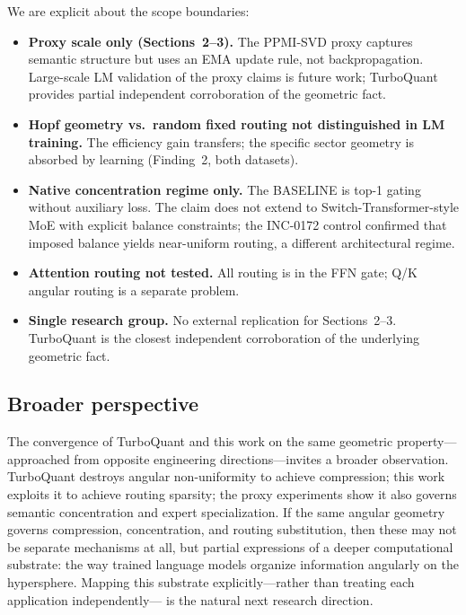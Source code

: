 \documentclass[11pt]{article}
\begin{document}
We are explicit about the scope boundaries:

\begin{itemize}[leftmargin=1.4em,itemsep=2pt]

\item \textbf{Proxy scale only (Sections~2--3).}
The PPMI-SVD proxy captures semantic structure but uses an EMA update rule, not
backpropagation.
Large-scale LM validation of the proxy claims is future work;
TurboQuant provides partial independent corroboration of the geometric fact.

\item \textbf{Hopf geometry vs.\ random fixed routing not distinguished in LM training.}
The efficiency gain transfers; the specific sector geometry is absorbed by learning
(Finding~2, both datasets).

\item \textbf{Native concentration regime only.}
The BASELINE is top-1 gating without auxiliary loss.
The claim does not extend to Switch-Transformer-style MoE with explicit balance
constraints; the INC-0172 control confirmed that imposed balance yields near-uniform
routing, a different architectural regime.

\item \textbf{Attention routing not tested.}
All routing is in the FFN gate; Q/K angular routing is a separate problem.

\item \textbf{Single research group.}
No external replication for Sections~2--3.
TurboQuant is the closest independent corroboration of the underlying geometric fact.

\end{itemize}

\subsection{Broader perspective}

The convergence of TurboQuant and this work on the same geometric property---approached
from opposite engineering directions---invites a broader observation.
TurboQuant destroys angular non-uniformity to achieve compression;
this work exploits it to achieve routing sparsity;
the proxy experiments show it also governs semantic concentration and expert
specialization.
If the same angular geometry governs compression, concentration, and routing
substitution, then these may not be separate mechanisms at all, but partial
expressions of a deeper computational substrate: the way trained language models
organize information angularly on the hypersphere.
Mapping this substrate explicitly---rather than treating each application independently---
is the natural next research direction.
\end{document}
